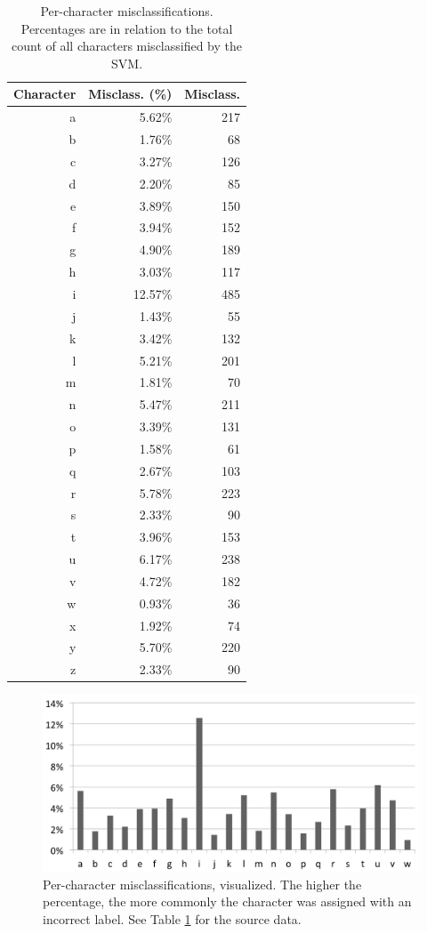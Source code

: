 \documentclass{netsec2012}
\begin{document}
\begin{table}[t]
\centering
\begin{tabular}{|r|r|r|}
\hline
Character & Misclass. (\%) & Misclass. \\
\hline
a &   5.62\% &   217 \\
b &   1.76\% &   68 \\
c &   3.27\% &   126 \\
d &   2.20\% &   85 \\
e &   3.89\% &   150 \\
f &   3.94\% &   152 \\
g &   4.90\% &   189 \\
h &   3.03\% &   117 \\
i &  12.57\% &   485 \\
j &   1.43\% &   55 \\
k &   3.42\% &   132 \\
l &   5.21\% &   201 \\
m &   1.81\% &   70 \\
n &   5.47\% &   211 \\
o &   3.39\% &   131 \\
p &   1.58\% &   61 \\
q &   2.67\% &   103 \\
r &   5.78\% &   223 \\
s &   2.33\% &   90 \\
t &   3.96\% &   153 \\
u &   6.17\% &   238 \\
v &   4.72\% &   182 \\
w &   0.93\% &   36 \\
x &   1.92\% &   74 \\
y &   5.70\% &   220 \\
z &   2.33\% &   90 \\
\hline
\end{tabular}
\caption{Per-character misclassifications.  Percentages are in relation to the total count of all
characters misclassified by the SVM.}
\label{tab:percharperformance}
\end{table}

\begin{figure}[t]
\centering
\includegraphics[width=120mm]{percharperf.png}
\caption{Per-character misclassifications, visualized.  The higher the percentage, the more commonly
the character was assigned with an incorrect label.  See Table \ref{tab:percharperformance} for the
source data.}
\label{fig:percharperformance}
\end{figure}
\end{document}

